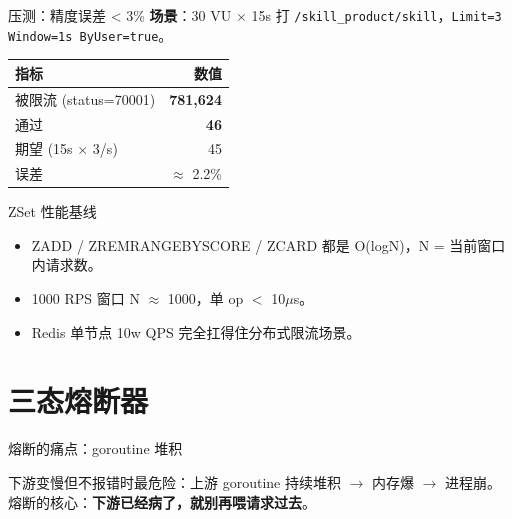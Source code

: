 \begin{frame}{压测：精度误差 < 3\%}
\textbf{场景}：30 VU $\times$ 15s 打 \texttt{/skill\_product/skill}，\texttt{Limit=3 Window=1s ByUser=true}。

\vspace{3mm}
\begin{tabular}{@{}lr@{}}
\toprule
指标 & 数值 \\
\midrule
被限流 (status=70001) & \textbf{781{,}624} \\
通过 & \textbf{46} \\
期望 (15s $\times$ 3/s) & 45 \\
误差 & $\approx$ 2.2\% \\
\bottomrule
\end{tabular}
\vspace{2mm}
\end{frame}

\begin{frame}{ZSet 性能基线}
\begin{itemize}
  \item ZADD / ZREMRANGEBYSCORE / ZCARD 都是 O(logN)，N = 当前窗口内请求数。
  \item 1000 RPS 窗口 N $\approx$ 1000，单 op $<$ 10$\mu$s。
  \item Redis 单节点 10w QPS 完全扛得住分布式限流场景。
\end{itemize}
\end{frame}

\section{三态熔断器}

\begin{frame}{熔断的痛点：goroutine 堆积}
\vspace{2mm}
\small 下游变慢但不报错时最危险：上游 goroutine 持续堆积 $\to$ 内存爆 $\to$ 进程崩。\\
熔断的核心：\textbf{下游已经病了，就别再喂请求过去}。
\end{frame}

